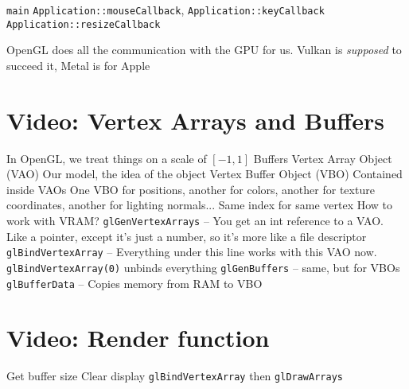 \begin{outline}
    \1 \texttt{main}
    \1 \texttt{Application::mouseCallback}, \texttt{Application::keyCallback}
    \1 \texttt{Application::resizeCallback}
\end{outline}

OpenGL does all the communication with the GPU for us. Vulkan is \textit{supposed} to succeed it, Metal is for Apple

\section{Video: Vertex Arrays and Buffers}

\begin{outline}
    \1 In OpenGL, we treat things on a scale of $[-1, 1]$
    \1 Buffers
        \2 Vertex Array Object (VAO)
            \3 Our model, the idea of the object
        \2 Vertex Buffer Object (VBO)
            \2 Contained inside VAOs
            \2 One VBO for positions, another for colors, another for texture coordinates, another for lighting normals...
            \2 Same index for same vertex
    \1 How to work with VRAM?
        \2 \texttt{glGenVertexArrays} -- You get an int reference to a VAO. Like a pointer, except it's just a number, so it's more like a file descriptor
        \2  \texttt{glBindVertexArray} -- Everything under this line works with this VAO now. \texttt{glBindVertexArray(0)} unbinds everything
        \2 \texttt{glGenBuffers} -- same, but for VBOs
        \2 \texttt{glBufferData} -- Copies memory from RAM to VBO
\end{outline}

\section{Video: Render function}

\begin{outline}[enumerate]
    \1 Get buffer size
    \1 Clear display
    \1 \texttt{glBindVertexArray} then \texttt{glDrawArrays}
\end{outline}

